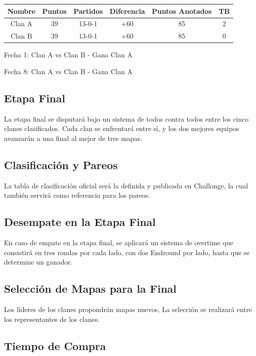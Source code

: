 \documentclass[a4paper, 11pt]{article}
\begin{document}
    \begin{center}
        \begin{tabular}{||c c c c c c||} 
         \hline
         Nombre & Puntos & Partidos & Diferencia & Puntos Anotados & TB\\ [0.5ex] 
         \hline\hline
         Clan A & 39 & 13-0-1 & +60 & 85 & 2 \\ 
         \hline
         Clan B & 39 & 13-0-1 & +60 & 85 & 0 \\
         \hline
        \end{tabular}
    \end{center}

    Fecha 1: Clan A vs Clan B - Gana Clan A \par
    Fecha 8: Clan A vs Clan B - Gana Clan A

    \subsection{Etapa Final}

    La etapa final se disputará bajo un sistema de todos contra todos entre los cinco clanes clasificados. Cada clan se enfrentará entre sí, y los dos mejores equipos avanzarán a una final al mejor de tres mapas.

    \subsection{Clasificación y Pareos}
    La tabla de clasificación oficial será la definida y publicada en Challonge, la cual también servirá como referencia para los pareos.

    \subsection{Desempate en la Etapa Final}
    En caso de empate en la etapa final, se aplicará un sistema de overtime que consistirá en tres rondas por cada lado, con dos Endround por lado, hasta que se determine un ganador.

    \subsection{Selección de Mapas para la Final}

    Los líderes de los clanes propondrán mapas nuevos, La selección se realizará entre los representantes de los clanes.

    \subsection{Tiempo de Compra}
\end{document}
